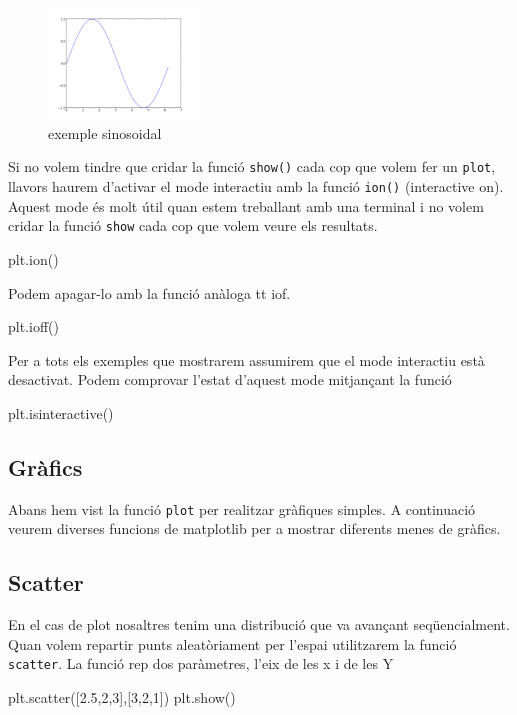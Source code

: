 \begin{figure}[!h]
    \begin{centering}
    \includegraphics[width=0.35\textwidth]{img/ex02.png}
    \caption{exemple sinosoidal}
    \label{fig:figex02}
    \end{centering}
\end{figure}
Si no volem tindre que cridar la funció {\tt show()} cada cop que volem fer un {\tt plot}, llavors haurem d'activar el mode interactiu amb la funció {\tt ion()} (interactive on). Aquest mode és molt útil quan estem treballant amb una terminal i no volem cridar la funció {\tt show} cada cop que volem veure els resultats.
\begin{blockcode}
plt.ion()
\end{blockcode}
Podem apagar-lo amb la funció anàloga {tt iof}.
\begin{blockcode}
plt.ioff()
\end{blockcode}
Per a tots els exemples que mostrarem assumirem que el mode interactiu està desactivat. Podem comprovar l'estat d'aquest mode mitjançant la funció
\begin{blockcode}
plt.isinteractive()
\end{blockcode}
\subsection{Gràfics}
Abans hem vist la funció {\tt plot} per realitzar gràfiques simples. A continuació veurem diverses funcions de matplotlib per a mostrar diferents menes de gràfics.

\subsection{Scatter}
En el cas de plot nosaltres tenim una distribució que va avançant seqüencialment. Quan volem repartir punts aleatòriament per l'espai utilitzarem la funció {\tt scatter}. La funció rep dos paràmetres, l'eix de les x i de les Y

\begin{tip}[caption=Funcio scatter]
plt.scatter([2.5,2,3],[3,2,1])
plt.show()
\end{tip}

